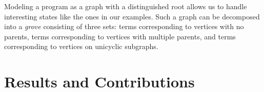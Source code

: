 \documentclass[nonacm, acmsmall, screen, review]{acmart}
\begin{document}






Modeling a program as a graph with a distinguished root allows us to handle interesting states like the ones in our examples.
Such a graph can be decomposed into a \emph{grove} consisting of three sets:
  terms corresponding to vertices with no parents,
  terms corresponding to vertices with multiple parents,
  and terms corresponding to vertices on unicyclic subgraphs.










\section{Results and Contributions}
\end{document}
